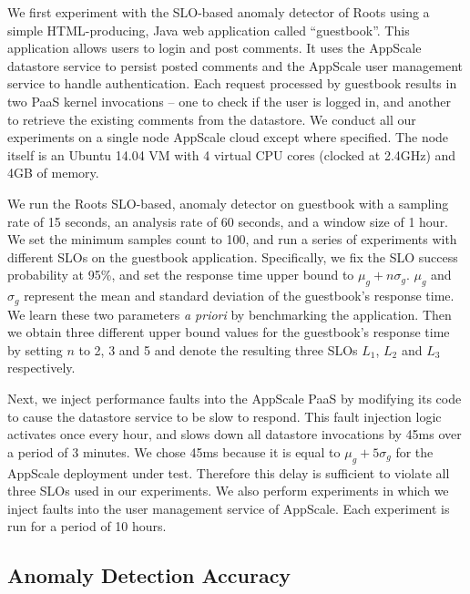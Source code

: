 We first experiment with the SLO-based anomaly detector of Roots
using a simple HTML-producing, Java 
web application called ``guestbook''.
This application allows users to login and post comments. It uses the
AppScale  datastore service to persist
posted comments and the AppScale user management service to handle authentication. 
Each request processed
by guestbook results in two PaaS kernel invocations -- one to check if the user is logged in, and 
another to retrieve the existing comments from the datastore. We conduct all
our experiments on a single node AppScale cloud except where specified. The node itself is an Ubuntu
14.04 VM with 4 virtual CPU cores (clocked at 2.4GHz) and 4GB of memory.

We run the Roots SLO-based, anomaly detector on guestbook with a sampling rate of 15 seconds, an analysis
rate of 60 seconds, and a window size of 1 hour. We set the minimum samples count to 100, and
run a series of experiments with different SLOs on the guestbook application. Specifically, we fix
the SLO success probability at 95\%, and set the response time upper bound to $\mu_g + n\sigma_g$. 
$\mu_g$ and $\sigma_g$ represent the mean and standard deviation of the
guestbook's response time. We learn these two parameters \textit{a priori} by benchmarking
the application. Then we obtain three different upper bound values for the guestbook's
response time by setting 
$n$ to 2, 3 and 5 and denote the resulting three SLOs $L_1$, $L_2$ and $L_3$ respectively.

Next, we inject performance faults into the AppScale PaaS by modifying its code
to cause the datastore service to be slow to respond.
This fault injection logic activates once every hour, and
slows down all datastore invocations by 45ms over a period of 3 minutes.
We chose 45ms because it is equal 
to $\mu_g + 5\sigma_g$ for the AppScale deployment under test. 
Therefore this delay is sufficient to violate all three SLOs used in our experiments. 
We also perform experiments in which we inject faults into the user management service of
AppScale. Each experiment is run for a period of 10 hours.

\subsection{Anomaly Detection Accuracy}

